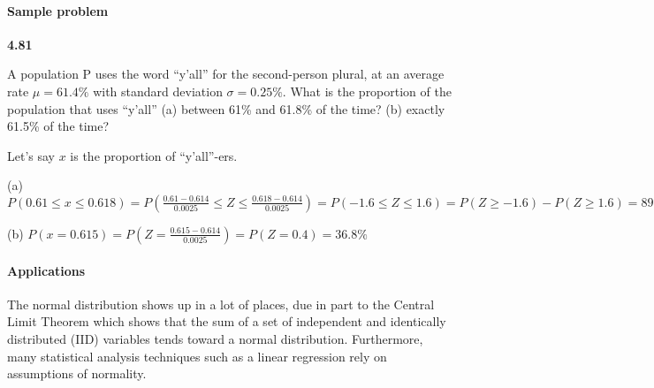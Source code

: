 \documentclass[11pt,letterpaper]{scrartcl}
\begin{document}
\paragraph{Sample problem}

\textbf{4.81}

A population P uses the word ``y'all'' for the second-person plural, at an average rate $\mu=61.4\%$ with standard deviation $\sigma=0.25\%$. 
What is the proportion of the population that uses ``y'all'' 
(a) between 61\% and 61.8\% of the time?
(b) exactly 61.5\% of the time?

Let's say $x$ is the proportion of ``y'all''-ers.

(a) $P(0.61 \leq x \leq 0.618) = P(\frac{0.61 - 0.614}{0.0025} \leq Z \leq \frac{0.618 - 0.614}{0.0025}) = P(-1.6 \leq Z \leq 1.6) = P(Z \geq -1.6) - P(Z \geq 1.6) = 89.04\%$

(b) $P(x = 0.615) = P(Z = \frac{0.615 - 0.614}{0.0025}) = P(Z = 0.4) = 36.8\%$

\paragraph{Applications}

The normal distribution shows up in a lot of places, due in part to the Central Limit Theorem which shows that the sum of a set of independent and identically distributed (IID) variables tends toward a normal distribution.
Furthermore, many statistical analysis techniques such as a linear regression rely on assumptions of normality.

%
%
\end{document}

